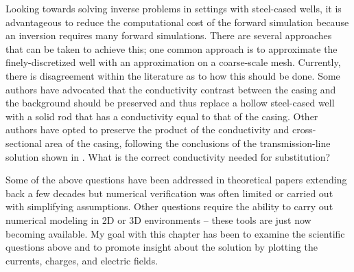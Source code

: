 Looking towards solving inverse problems in settings with steel-cased wells, it is advantageous to reduce the computational cost of the forward simulation because an inversion requires many forward simulations. There are several approaches that can be taken to achieve this; one common approach is to approximate the finely-discretized well with an approximation on a coarse-scale mesh. Currently, there is disagreement within the literature as to how this should be done. Some authors have advocated that the conductivity contrast between the casing and the background should be preserved and thus replace a hollow steel-cased well with a solid rod that has a conductivity equal to that of the casing. Other authors have opted to preserve the product of the conductivity and cross-sectional area of the casing, following the conclusions of the transmission-line solution shown in \cite{Kaufman1990}. What is the correct conductivity needed for substitution?

Some of the above questions have been addressed in theoretical papers extending back a few decades but numerical verification was often limited or carried out with simplifying assumptions. Other questions require the ability to carry out numerical modeling in 2D or 3D environments -- these tools are just now becoming available. My goal with this chapter has been to examine the scientific questions above and to promote insight about the solution by plotting the currents, charges, and electric fields.

